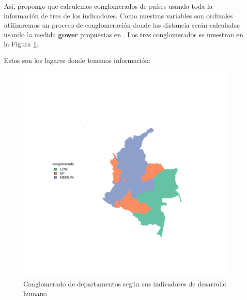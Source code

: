 \documentclass{article}
\begin{document}
As\'i, propongo que calculemos conglomerados de pa\'ises usando toda la informaci\'on de tres de los indicadores. Como nuestras variables son ordinales utilizaremos un proceso de conglomeraci\'on donde las distancia ser\'an calculadas usando la medida {\bf gower} propuestas en \cite{macqueen_methods_nodate}. Los tres conglomerados se muestran en la Figura \ref{clustmap}.

Estos son los lugares donde tenemos informaci\'on:



\begin{figure}[h]
\centering
\begin{adjustbox}{width=11cm,height=8cm,clip,trim=1cm 1cm 2cm 1cm}
\includegraphics{Proyecto_final-plotMap}
\end{adjustbox}
\caption{Conglomerado de departamentos seg\'un sus indicadores de desarrollo humano}\label{clustmap}
\end{figure}
\clearpage

\renewcommand{\refname}{Bibliograf\'ia}

\end{document}
